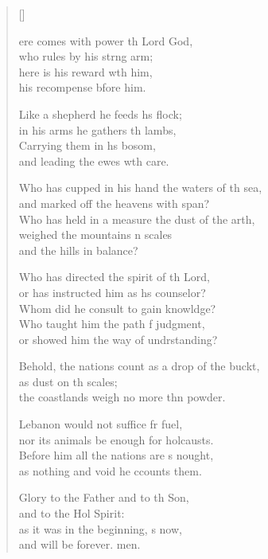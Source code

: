 \settowidth{\versewidth}{Behold, the nations count as a drop of the bucket, +}
\begin{verse}[\versewidth]
  \begin{patverse}
ere comes with power th Lord God,\Med\\
who rules by his strng arm;\\
here is his reward w\pointup{\i}th him,\Med\\
his recompense bfore him.

Like a shepherd he feeds h\pointup{\i}s flock;\Med\\
in his arms he gathers th lambs,\\
Carrying them in h\pointup{\i}s bosom,\Med\\
and leading the ewes w\pointup{\i}th care.

Who has cupped in his hand the waters of th sea,\Med\\
and marked off the heavens with  span?\\
Who has held in a measure the dust of the arth,\Flex\\
weighed the mountains \pointup{\i}n scales\Med\\
and the hills in  balance?

Who has directed the spirit of th Lord,\Med\\
or has instructed him as h\pointup{\i}s counselor?\\
Whom did he consult to gain knowldge?\Flex\\
Who taught him the path f judgment,\Med\\
or showed him the way of undrstanding?

Behold, the nations count as a drop of the buckt,\Flex\\
as dust on th scales;\Med\\
the coastlands weigh no more thn powder.

Lebanon would not suffice fr fuel,\Med\\
nor its animals be enough for holcausts.\\
Before him all the nations are s nought,\Med\\
as nothing and void he ccounts them.

Glory to the Father and to th Son,\Med\\
and to the Hol Spirit:\\
as it was in the beginning, \pointup{\i}s now,\Med\\
and will be forever. men.
  \end{patverse}
\end{verse}
